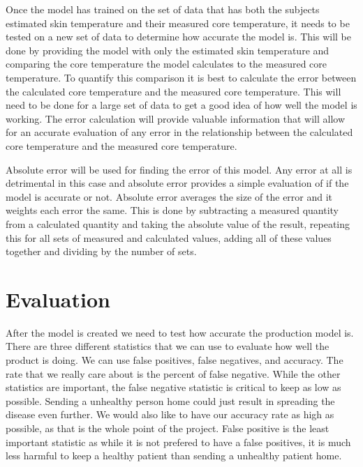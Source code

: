 ﻿\documentclass[onecolumn, draftclsnofoot,10pt, compsoc]{IEEEtran}
\begin{document}
Once the model has trained on the set of data that has both the subjects estimated skin temperature and their measured core temperature, it needs to be tested on a new set of data to determine how accurate the model is. This will be done by providing the model with only the estimated skin temperature and comparing the core temperature the model calculates to the measured core temperature. To quantify this comparison it is best to calculate the error between the calculated core temperature and the measured core temperature. This will need to be done for a large set of data to get a good idea of how well the model is working. The error calculation will provide valuable information that will allow for an accurate evaluation of any error in the relationship between the calculated core temperature and the measured core temperature. 

Absolute error will be used for finding the error of this model. Any error at all is detrimental in this case and absolute error provides a simple evaluation of if the model is accurate or not. Absolute error averages the size of the error and it weights each error the same. This is done by subtracting a measured quantity from a calculated quantity and taking the absolute value of the result, repeating this for all sets of measured and calculated values, adding all of these values together and dividing by the number of sets. 


\section{Evaluation}

After the model is created we need to test how accurate the production model is. There are three different statistics that we can use to evaluate how well the product is doing. We can use false positives, false negatives, and accuracy. The rate that we really care about is the percent of false negative. While the other statistics are important, the false negative statistic is critical to keep as low as possible. Sending a unhealthy person home could just result in spreading the disease even further. We would also like to have our accuracy rate as high as possible, as that is the whole point of the project. False positive is the least important statistic as while it is not prefered to have a false positives, it is much less harmful to keep a healthy patient than sending a unhealthy patient home.
\end{document}
